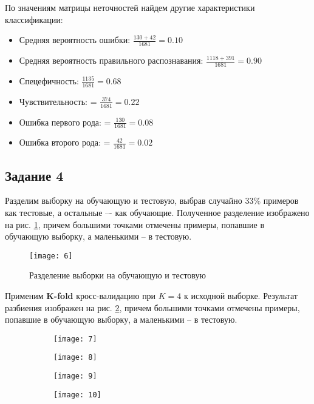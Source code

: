 По значениям матрицы неточностей найдем другие характеристики классификации:
\begin{itemize}
	\setlength\itemsep{0em}
	\item Средняя вероятность ошибки: $\frac{130+42}{1681} = 0.10$
	\item Средняя вероятность правильного распознавания: $\frac{1118+391}{1681} = 0.90$
	\item Спецефичность: $\frac{1135}{1681} = 0.68$
	\item Чувствительность: = $\frac{374}{1681} = 0.22$
	\item Ошибка первого рода: = $\frac{130}{1681} = 0.08$
	\item Ошибка второго рода: = $\frac{42}{1681} = 0.02$
\end{itemize}

\subsection{Задание 4}

Разделим выборку на обучающую и тестовую, выбрав случайно $33\%$ примеров как тестовые, а остальные –- как обучающие. Полученное разделение изображено на рис. \ref{fig:two_classes_train_and_test}, причем большими точками отмечены примеры, попавшие в обучающую выборку, а маленькими -- в тестовую.

\begin{figure}[H]
\begin{center}
	\texttt{[image: 6]}
	\caption{Разделение выборки на обучающую и тестовую}
	\label{fig:two_classes_train_and_test}
\end{center}
\end{figure}

\newpage

Применим \textbf{K-fold} кросс-валидацию при $K=4$ к исходной выборке. Результат разбиения изображен на рис. \ref{fig:two_classes_kfold}, причем большими точками отмечены примеры, попавшие в обучающую выборку, а маленькими -- в тестовую.

\begin{figure}[H]
\begin{center}
	\begin{subfigure}[b]{0.49\textwidth}
		\texttt{[image: 7]}
	\end{subfigure}
	\begin{subfigure}[b]{0.49\textwidth}
		\texttt{[image: 8]}
	\end{subfigure}
	\begin{subfigure}[b]{0.49\textwidth}
		\texttt{[image: 9]}
	\end{subfigure}
	\begin{subfigure}[b]{0.49\textwidth}
		\texttt{[image: 10]}
	\end{subfigure}
	\caption{}
	\label{fig:two_classes_kfold}
\end{center}
\end{figure}

